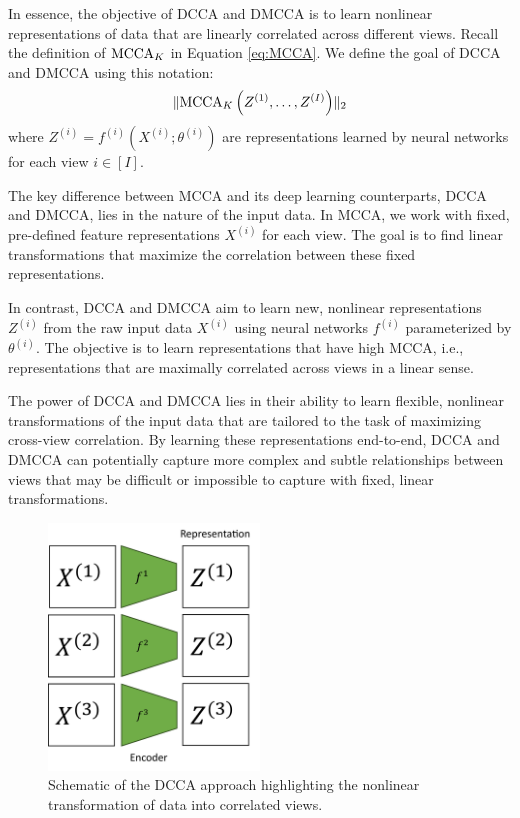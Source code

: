In essence, the objective of DCCA and DMCCA is to learn nonlinear representations of data that are linearly correlated across different views.
Recall the definition of $\operatorname{MCCA}_K$ in Equation \eqref{eq:MCCA}. We define the goal of DCCA and DMCCA using this notation:
\begin{align}
\label{eq:DMCCA-def}
\lVert\operatorname{MCCA}_K\left(Z^{(1)}, \ldots, Z^{(I)}\right)\rVert_2
\end{align}
where $Z^{(i)} = f^{(i)}(X^{(i)}; \theta^{(i)})$ are representations learned by neural networks for each view $i \in [I]$.

The key difference between MCCA and its deep learning counterparts, DCCA and DMCCA, lies in the nature of the input data. In MCCA, we work with fixed, pre-defined feature representations $X^{(i)}$ for each view. The goal is to find linear transformations that maximize the correlation between these fixed representations.

In contrast, DCCA and DMCCA aim to learn new, nonlinear representations $Z^{(i)}$ from the raw input data $X^{(i)}$ using neural networks $f^{(i)}$ parameterized by $\theta^{(i)}$. The objective is to learn representations that have high MCCA, i.e., representations that are maximally correlated across views in a linear sense.

The power of DCCA and DMCCA lies in their ability to learn flexible, nonlinear transformations of the input data that are tailored to the task of maximizing cross-view correlation. By learning these representations end-to-end, DCCA and DMCCA can potentially capture more complex and subtle relationships between views that may be difficult or impossible to capture with fixed, linear transformations.

\begin{figure}
\centering
\includegraphics[width=0.5\textwidth]{figures/dcca_schematic}
\caption{Schematic of the DCCA approach highlighting the nonlinear transformation of data into correlated views.}
\label{fig:dcca_schematic}
\end{figure}

